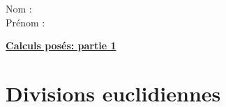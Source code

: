 \documentclass[a4paper,12pt]{article}
\begin{document}
\noindent Nom : \hspace{6cm} \\[0.4cm]
\noindent Prénom : \hspace{6cm}

\vspace{1cm}

\begin{center}
    {\Huge \underline{\textbf{Calculs posés: partie 1}}}\\[0.5cm]
\end{center}

\vspace{0.5cm}

\section*{Divisions euclidiennes}

\vspace{1cm}
\end{document}
